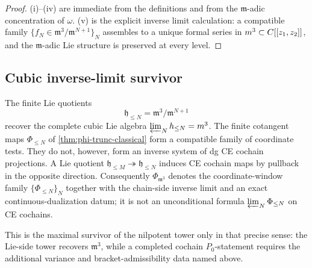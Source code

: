 \begin{proof}
(i)--(iv) are immediate from the definitions and from the
$\mathfrak m$-adic concentration of $\omega$. (v) is the explicit
inverse limit calculation: a compatible family
$\{f_N\in\mathfrak m^3/\mathfrak m^{N+1}\}_N$ assembles to a unique
formal series in $\mathfrak m^3\subset\C[[z_1,z_2]]$, and the
$\mathfrak m$-adic Lie structure is preserved at every level.
\end{proof}

\subsection*{Cubic inverse-limit survivor}

\begin{prop}
\label{prop:colim-recovery}
The finite Lie quotients
\[
  \mathfrak h_{\leq N}=\mathfrak m^3/\mathfrak m^{N+1}
\]
recover the complete cubic Lie algebra
\(\varprojlim_N\mathfrak h_{\leq N}=\mathfrak m^3\).  The finite
cotangent maps \(\Phi_{\leq N}\) of
\ref{thm:phi-trunc-classical} form a compatible family of coordinate
tests.  They do not, however, form an inverse system of dg CE cochain
projections.  A Lie quotient
\(\mathfrak h_{\leq M}\twoheadrightarrow\mathfrak h_{\leq N}\) induces CE
cochain maps by pullback in the opposite direction.  Consequently
\(\Phi_{\mathfrak m^3}\) denotes the coordinate-window family
\(\{\Phi_{\leq N}\}_N\) together with the chain-side inverse limit and an
exact continuous-dualization datum; it is not an unconditional formula
\(\varprojlim_N\Phi_{\leq N}\) on CE cochains.

This is the maximal survivor of the nilpotent tower only in that precise
sense: the Lie-side tower recovers \(\mathfrak m^3\), while a completed
cochain \(P_0\)-statement requires the additional variance and
bracket-admissibility data named above.
\end{prop}

